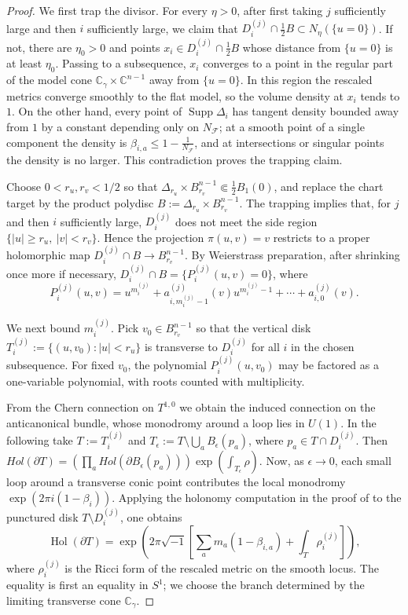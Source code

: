 \documentclass[11pt]{amsart}
\theoremstyle{definition}
\theoremstyle{remark}
\begin{document}
\begin{proof}
We first trap the divisor. For every $\eta>0$, after first taking $j$ sufficiently
large and then $i$ sufficiently large, we claim that
$D_i^{(j)}\cap \frac12B\subset N_\eta(\{u=0\})$. If not, there are
$\eta_0>0$ and points $x_i\in D_i^{(j)}\cap \frac12B$ whose distance from
$\{u=0\}$ is at least $\eta_0$. Passing to a subsequence, $x_i$ converges to a
point in the regular part of the model cone
$\mathbb C_\gamma\times\mathbb C^{n-1}$ away from $\{u=0\}$. In this region the
rescaled metrics converge smoothly to the flat model, so the volume density at
$x_i$ tends to $1$. On the other hand, every point of
$\operatorname{Supp}\Delta_i$ has tangent density bounded away from $1$ by a
constant depending only on $N_{\mathcal F}$; at a smooth point of a single
component the density is $\beta_{i,a}\leq 1-\frac1{N_{\mathcal F}}$, and at
intersections or singular points the density is no larger. This contradiction
proves the trapping claim.

Choose $0<r_u,r_v<1/2$ so that
$\Delta_{r_u}\times B_{r_v}^{n-1}\Subset \frac12 B_1(0)$, and replace the
chart target by the product polydisc
$B:=\Delta_{r_u}\times B_{r_v}^{n-1}$. The trapping implies that, for $j$ and then
$i$ sufficiently large, $D_i^{(j)}$ does not meet the side region
$\{|u|\geq r_u,\ |v|<r_v\}$. Hence the projection $\pi(u,v)=v$ restricts to a
proper holomorphic map $D_i^{(j)}\cap B\to B_{r_v}^{n-1}$. By Weierstrass
preparation, after shrinking once more if necessary,
$D_i^{(j)}\cap B=\{P_i^{(j)}(u,v)=0\}$, where
\[
        P_i^{(j)}(u,v)
        =
        u^{m_i^{(j)}}
        +a_{i,m_i^{(j)}-1}^{(j)}(v)u^{m_i^{(j)}-1}
        +\cdots+a_{i,0}^{(j)}(v).
\]

We next bound $m_i^{(j)}$. Pick $v_0\in B_{r_v}^{n-1}$ so that the vertical disk
$T_i^{(j)}:=\{(u,v_0): |u|<r_u\}$ is transverse to $D_i^{(j)}$ for all $i$ in
the chosen subsequence. For fixed $v_0$, the polynomial
$P_i^{(j)}(u,v_0)$ may be factored as a one-variable polynomial, with roots
counted with multiplicity. 

From the Chern connection on $T^{1,0}$ we obtain the induced connection on the
anticanonical bundle, whose monodromy around a loop lies in $U(1)$. In the
following take $T:=T_i^{(j)}$ and
$T_\epsilon:=T\setminus\bigcup_a B_\epsilon(p_a)$, where
$p_a\in T\cap D_i^{(j)}$.
Then $Hol(\partial T) = (\prod_a Hol (\partial B_\epsilon(p_a))) \exp(\int_{T_\epsilon} \rho)$. Now, as $\epsilon \rightarrow 0$, each small loop around a transverse conic point contributes the local monodromy $\exp(2 \pi i (1 - \beta_i))$. Applying the holonomy computation in the proof of
\cite[Proposition~13]{CDSII} to the punctured disk
$T\setminus D_i^{(j)}$, one obtains
\[
        \operatorname{Hol}(\partial T)
        =
        \exp\left(
        2\pi\sqrt{-1}
        \left[
        \sum_a m_a(1-\beta_{i,a})
        +\int_T\rho_i^{(j)}
        \right]\right),
\]
where $\rho_i^{(j)}$ is the Ricci form of the rescaled metric on the smooth
locus. The equality is first an equality in $S^1$; we choose the branch
determined by the limiting transverse cone $\mathbb C_\gamma$.


\end{proof}
\end{document}
